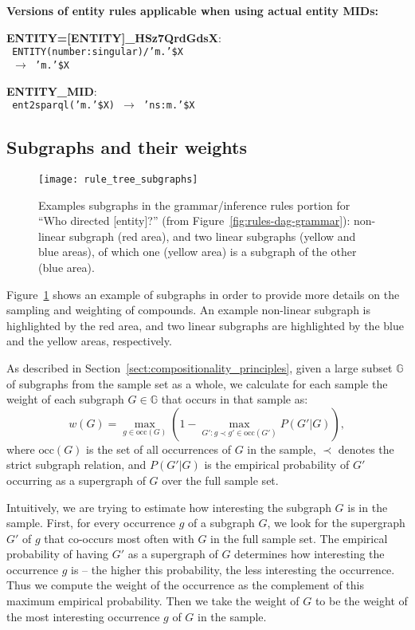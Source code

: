 \documentclass[letterpaper]{article}
\newcommand{\myparagraph}[1]{\textbf{#1}~}
\begin{document}
\myparagraph{Versions of entity rules applicable when using actual entity MIDs:}

\begin{flushleft}
\small{
    \noindent \textbf{ENTITY=[ENTITY]\_HSz7QrdGdsX}: \\
    \texttt{
    ENTITY(number:singular)/'m.'\$X \\
    ~$\rightarrow$ 'm.'\$X
    }
    
    \noindent \textbf{ENTITY\_MID}: \\
    \texttt{
    ent2sparql('m.'\$X) $\rightarrow$ 'ns:m.'\$X
    }
}
\end{flushleft}

\subsection{Subgraphs and their weights}
\label{suppl:subgraphs}

\begin{figure*}
  \centering
  \texttt{[image: rule\_tree\_subgraphs]}
  \caption{Examples subgraphs in the grammar/inference rules portion for ``Who directed [entity]?'' (from Figure~\ref{fig:rules-dag-grammar}): non-linear subgraph (red area), and two linear subgraphs (yellow and blue areas), of which one (yellow area) is a subgraph of the other (blue area).}
  \label{fig:rules-dag-subgraphs}
\end{figure*}

Figure~\ref{fig:rules-dag-subgraphs} shows an example of subgraphs in order to provide more details on the sampling and weighting of compounds. An example non-linear subgraph is highlighted by the red area, and two linear subgraphs are highlighted by the blue and the yellow areas, respectively.

As described in Section~\ref{sect:compositionality_principles}, given a large subset $\mathbb{G}$ of subgraphs from the sample set as a whole,
we calculate for each sample the weight of each subgraph $G \in \mathbb{G}$ that occurs in that sample as:
$$w(G) = \max_{g \in \text{occ}(G)} (1 - \max_{G': g \prec g' \in \text{occ}(G')} P(G'| G)),$$
where 
$\text{occ}(G)$ is the set of all occurrences of $G$ in the sample, $\prec$  denotes the strict subgraph relation, and $P(G'| G)$ is the empirical probability of $G'$ occurring as a supergraph of $G$ over the full sample set.

Intuitively, we are trying to estimate how interesting the subgraph $G$ is in the sample. First, for every occurrence $g$ of a subgraph $G$, we look for the supergraph $G'$ of $g$ that co-occurs most often with $G$ in the full sample set. The empirical probability of having $G'$ as a supergraph of $G$ determines how interesting the occurrence $g$ is -- the higher this probability, the less interesting the occurrence. Thus we compute the weight of the occurrence as the complement of this maximum empirical probability. Then we take the weight of $G$ to be the weight of the most interesting occurrence $g$ of $G$ in the sample.
\end{document}
